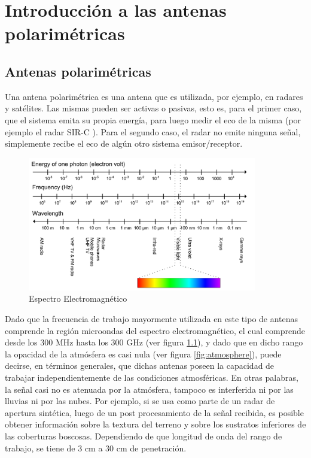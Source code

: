 
\chapter{Introducción a las antenas polarimétricas} %
\label{ch:phasedArray}

\section{Antenas polarimétricas}

Una antena polarimétrica es una antena que es utilizada, por ejemplo, en radares y satélites. Las mismas pueden ser activas 
o pasivas, esto es, para el primer caso, que el sistema emita su propia energía, para luego medir el eco de la misma (por 
ejemplo el radar SIR-C \cite{Curlander1991}). Para el segundo caso, el radar no emite ninguna señal, simplemente recibe el eco 
de algún otro sistema emisor/receptor.

\begin{figure}[H]
 \centering
 \includegraphics[width=10cm]{gfx/electromagneticSpectrum.png}
 \caption{Espectro Electromagnético \cite{electromagneticField}}
 \label{fig:spectrum}
\end{figure}

Dado que la frecuencia de trabajo mayormente utilizada en este tipo de antenas comprende la región microondas del espectro
electromagnético, el cual comprende desde los 300 MHz hasta los 300 GHz (ver figura \ref{fig:spectrum}), y dado que en dicho rango la 
opacidad de la atmósfera es casi nula (ver figura \ref{fig:atmosphere}), puede decirse, en términos generales, que dichas 
antenas poseen la capacidad de trabajar independientemente de las condiciones atmosféricas. En otras palabras, la señal casi no es 
atenuada por la atmósfera, tampoco es interferida ni por las lluvias ni por las nubes. Por ejemplo, si se usa como parte de un 
radar de apertura sintética, luego de un post procesamiento de la señal recibida, es posible obtener información sobre la 
textura del terreno y sobre los sustratos inferiores de las coberturas boscosas. Dependiendo de que longitud de onda del rango de
trabajo, se tiene de 3 cm a 30 cm de penetración.

